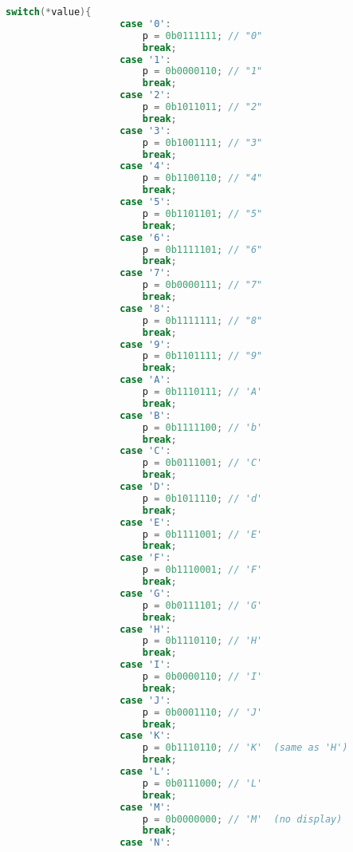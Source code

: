 \begin{lstlisting}[style=mystyle_c, language=c, breaklines]
                switch(*value){
                    case '0':
                        p = 0b0111111; // "0"          
                        break;
                    case '1':
                        p = 0b0000110; // "1"
                        break;         
                    case '2':
                        p = 0b1011011; // "2"
                        break;         
                    case '3':
                        p = 0b1001111; // "3"         
                        break;
                    case '4':
                        p = 0b1100110; // "4"         
                        break;
                    case '5':
                        p = 0b1101101; // "5"         
                        break;
                    case '6':
                        p = 0b1111101; // "6"        
                        break;
                    case '7':
                        p = 0b0000111; // "7"
                        break;
                    case '8':
                        p = 0b1111111; // "8"
                        break;
                    case '9':
                        p = 0b1101111; // "9"
                        break;
                    case 'A':
                        p = 0b1110111; // 'A'
                        break;
                    case 'B':
                        p = 0b1111100; // 'b'
                        break;
                    case 'C':
                        p = 0b0111001; // 'C'
                        break;
                    case 'D':
                        p = 0b1011110; // 'd'
                        break;
                    case 'E':
                        p = 0b1111001; // 'E'
                        break;
                    case 'F':
                        p = 0b1110001; // 'F'
                        break;
                    case 'G':
                        p = 0b0111101; // 'G'
                        break;
                    case 'H':
                        p = 0b1110110; // 'H'
                        break;
                    case 'I':
                        p = 0b0000110; // 'I'
                        break;
                    case 'J':
                        p = 0b0001110; // 'J'
                        break;
                    case 'K':
                        p = 0b1110110; // 'K'  (same as 'H')
                        break;
                    case 'L':
                        p = 0b0111000; // 'L'
                        break;
                    case 'M':
                        p = 0b0000000; // 'M'  (no display)
                        break;
                    case 'N':

\end{lstlisting}
